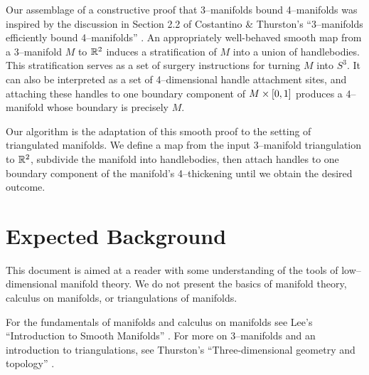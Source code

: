 %

Our assemblage of a constructive proof that 3--manifolds bound 4--manifolds was inspired by the discussion in Section 2.2 of Costantino \& Thurston's ``3--manifolds efficiently bound 4--manifolds'' \cite{CostThur08}.
An appropriately well-behaved smooth map from a 3--manifold $M$ to $\mathbb{R}^2$ induces a stratification of $M$ into a union of handlebodies.
This stratification serves as a set of surgery instructions for turning $M$ into $S^3$.
It can also be interpreted as a set of 4--dimensional handle attachment sites, and attaching these handles to one boundary component of $M\times[0,1]$ produces a 4--manifold whose boundary is precisely $M$.

Our algorithm is the adaptation of this smooth proof to the setting of triangulated manifolds.
We define a map from the input 3--manifold triangulation to $\mathbb{R}^2$, subdivide the manifold into handlebodies, then attach handles to one boundary component of the manifold's 4--thickening until we obtain the desired outcome.

\section{Expected Background}

This document is aimed at a reader with some understanding of the tools of low--dimensional manifold theory.
We do not present the basics of manifold theory, calculus on manifolds, or triangulations of manifolds.

For the fundamentals of manifolds and calculus on manifolds see Lee's ``Introduction to Smooth Manifolds'' \cite{Lee00}.
For more on 3--manifolds and an introduction to triangulations, see Thurston's ``Three-dimensional geometry and topology'' \cite{thurston1979geometry}.

